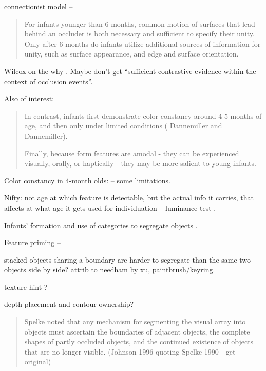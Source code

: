 connectionist model
\cite{mareschal02learning} --

\begin{quote}

For infants younger than 6 months, common motion of surfaces that lead
behind an occluder is both necessary and sufficient to specify their
unity. Only after 6 months do infants utilize additional sources of
information for unity, such as surface appearance, and edge and
surface orientation. \cite{mareschal02learning}

\end{quote}


Wilcox on the why \cite{wilcox99object}.  Maybe don't get
``sufficient contrastive evidence within the context of
occlusion events''.


Also of interest:

\begin{quote}

In contrast, infants first demonstrate color constancy around 4-5
months of age, and then only under limited conditions ( Dannemiller
and Dannemiller).

Finally, because form features are amodal - they can be
experienced visually, orally, or haptically - they may be more
salient to young infants.

\end{quote}

Color constancy in 4-month olds: \cite{dannemiller87test} -- some 
limitations.

Nifty: not age at which feature is detectable, but the actual
info it carries, that affects at what age it gets used for
individuation -- luminance test \cite{woods05infants}.

Infants' formation and use of categories to segregate objects 
\cite{needham05infants}.

Feature priming -- \cite{wilcox04priming}


stacked objects sharing a boundary are harder
to segregate than the same two objects
side by side?  attrib to needham by xu,
paintbrush/keyring.


texture hint \cite{johnson96perception}?

depth placement and contour ownership?

\begin{quote}

Spelke noted that any mechanism for segmenting the visual array
into objects must ascertain the boundaries of adjacent objects,
the complete shapes of partly occluded objects, and the continued
existence of objects that are no longer visible.
(Johnson 1996 quoting Spelke 1990 - get original)

\end{quote}

